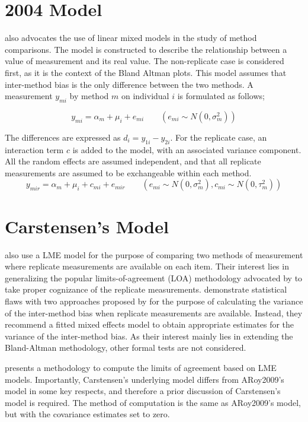 \documentclass[12pt, a4paper]{report}
\theoremstyle{plain}
\theoremstyle{definition}
\theoremstyle{remark}
\begin{document}
	\section{2004 Model}
	\cite{BXC2004} also advocates the use of linear mixed models in the study of method comparisons. 
	The model is constructed to describe the relationship between a value of measurement and its
	real value.
	The non-replicate case is considered first, as it is the context of the Bland Altman plots. This model assumes that
	inter-method bias is the only difference between the two methods. A measurement $y_{mi}$ by method $m$ on individual $i$ is
	formulated as follows;
	
	\begin{equation}
	y_{mi}  = \alpha_{m} + \mu_{i} + e_{mi} \qquad ( e_{mi} \sim
	N(0,\sigma^{2}_{m}))
	\end{equation}
	
	The differences are expressed as $d_{i} = y_{1i} - y_{2i}$. For the replicate case, an interaction term $c$ is added to the model, with an associated variance component. All the random effects are assumed independent, and that all replicate measurements are assumed to be exchangeable within each method.
	\begin{equation}
	y_{mir}  = \alpha_{m} + \mu_{i} + c_{mi} + e_{mir} \qquad ( e_{mi}
	\sim N(0,\sigma^{2}_{m}), c_{mi} \sim N(0,\tau^{2}_{m}))
	\end{equation}
	\section{Carstensen's Model}
	\cite{BXC2008} also use a LME model for the purpose of comparing two methods of measurement where replicate measurements are available on each item. Their interest lies in generalizing the popular limits-of-agreement (LOA) methodology advocated by \citet{BA86} to take proper cognizance of the replicate measurements. \citet{BXC2008} demonstrate statistical flaws with two approaches proposed by \citet{BA99} for the purpose of calculating the variance of the inter-method bias when replicate measurements are available. Instead, they recommend a fitted mixed effects model to obtain appropriate estimates for the variance of the inter-method bias. As their interest mainly lies in extending the Bland-Altman methodology, other formal tests are not considered.
	
	
	\citet{BXC2008} presents a methodology to compute the limits of
	agreement based on LME models. Importantly, Carstensen's underlying model differs from ARoy2009's model in some key respects, and therefore a prior discussion of Carstensen's model is required. The method of computation is the
	same as ARoy2009's model, but with the covariance estimates set to zero.
	
\end{document}
